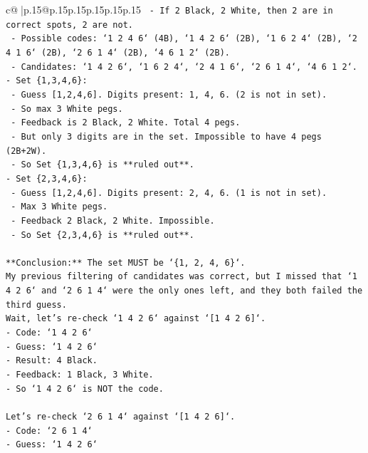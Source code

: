\documentclass{article}
\begin{document}
{\begin{supertabular}{c@{$\;$}|p{.15\linewidth}@{}p{.15\linewidth}p{.15\linewidth}p{.15\linewidth}p{.15\linewidth}p{.15\linewidth}}
{{{\texttt{  {-} If 2 Black, 2 White, then 2 are in correct spots, 2 are not.} \\
\texttt{  {-} Possible codes: `1 2 4 6` (4B), `1 4 2 6` (2B), `1 6 2 4` (2B), `2 4 1 6` (2B), `2 6 1 4` (2B), `4 6 1 2` (2B).} \\
\texttt{  {-} Candidates: `1 4 2 6`, `1 6 2 4`, `2 4 1 6`, `2 6 1 4`, `4 6 1 2`.} \\
\texttt{{-} Set \{1,3,4,6\}:} \\
\texttt{  {-} Guess {[}1,2,4,6{]}. Digits present: 1, 4, 6. (2 is not in set).} \\
\texttt{  {-} So max 3 White pegs.} \\
\texttt{  {-} Feedback is 2 Black, 2 White. Total 4 pegs.} \\
\texttt{  {-} But only 3 digits are in the set. Impossible to have 4 pegs (2B+2W).} \\
\texttt{  {-} So Set \{1,3,4,6\} is **ruled out**.} \\
\texttt{{-} Set \{2,3,4,6\}:} \\
\texttt{  {-} Guess {[}1,2,4,6{]}. Digits present: 2, 4, 6. (1 is not in set).} \\
\texttt{  {-} Max 3 White pegs.} \\
\texttt{  {-} Feedback 2 Black, 2 White. Impossible.} \\
\texttt{  {-} So Set \{2,3,4,6\} is **ruled out**.} \\
\\ 
\texttt{**Conclusion:** The set MUST be `\{1, 2, 4, 6\}`.} \\
\texttt{My previous filtering of candidates was correct, but I missed that `1 4 2 6` and `2 6 1 4` were the only ones left, and they both failed the third guess.} \\
\texttt{Wait, let's re{-}check `1 4 2 6` against `{[}1 4 2 6{]}`.} \\
\texttt{{-} Code: `1 4 2 6`} \\
\texttt{{-} Guess: `1 4 2 6`} \\
\texttt{{-} Result: 4 Black.} \\
\texttt{{-} Feedback: 1 Black, 3 White.} \\
\texttt{{-} So `1 4 2 6` is NOT the code.} \\
\\ 
\texttt{Let's re{-}check `2 6 1 4` against `{[}1 4 2 6{]}`.} \\
\texttt{{-} Code: `2 6 1 4`} \\
\texttt{{-} Guess: `1 4 2 6`} \\
}}}
\end{supertabular}}
\end{document}
